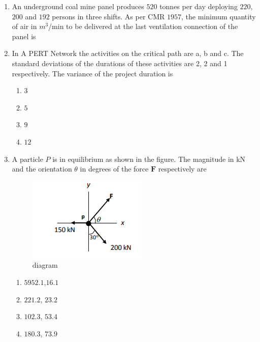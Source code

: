 \documentclass[journal,12pt,onecolumn]{IEEEtran}
\theoremstyle{remark}
\begin{document}
\begin{enumerate}
\item An underground coal mine panel produces $520$ tonnes per day deploying $220$, $200$ and $192$ persons
in three shifts. As per CMR $1957$, the minimum quantity of air in $m^3$/min to be delivered at the last ventilation connection of the panel is

\hfill{}

\item In A PERT Network the activities on the critical path are a, b and c. The standard deviations of the durations of these activities are 2, 2 and 1 respectively. The variance of the project duration is 

\hfill{}
\begin{multicols}{4}
\begin{enumerate}
\item $3$
\item $5$
\item $9$
\item $12$
\end{enumerate}
\end{multicols}

\item A particle $P$ is in equilibrium as shown in the figure. The magnitude in kN and the orientation $\theta$ in degrees of the force $\mathbf{F}$ respectively are 
\begin{figure}[H]
  \centering
  \includegraphics[width=0.4\columnwidth]{figs/diagram.png}
  \caption{diagram}
  \label{fig:36}
\end{figure}

\hfill{}
\begin{multicols}{4}
\begin{enumerate}
\item $5952.1$,$16.1$
\item $221.2$, $23.2$
\item $ 102.3$, $53.4$
\item $180.3$, $73.9$
\end{enumerate}
\end{multicols}


\end{enumerate}
\end{document}
